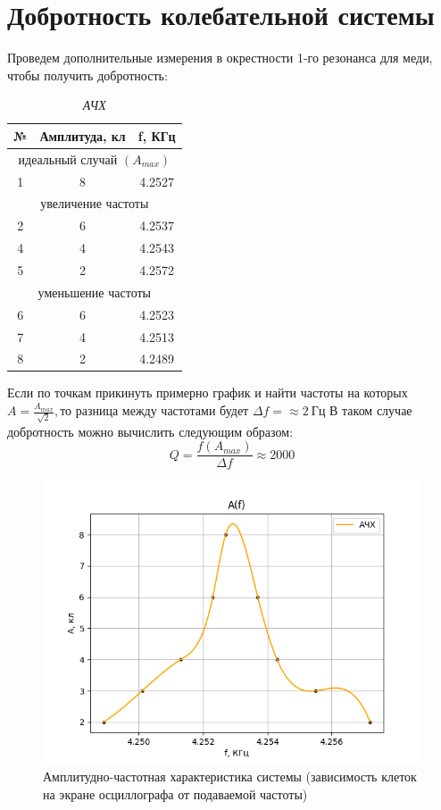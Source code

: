 \documentclass[a4paper, 10pt, twocolumn]{article}
\begin{document}
\section{Добротность колебательной системы}
 Проведем дополнительные измерения в окрестности 1-го резонанса
для меди, чтобы получить добротность:
\begin{table}[h]
    \centering
    \caption{\textit{АЧХ}}
    \label{tab:my_label}
    \begin{tabular}{|c|c|c|}
    \hline
    № & Амплитуда, кл & f, КГц \\ \hline
    \multicolumn{3}{c}{идеальный случай $(A_{max})$} \\ \hline
    1 & 8 & 4.2527 \\ \hline
    \multicolumn{3}{c}{увеличение частоты} \\ \hline
    2 & 6 & 4.2537 \\ \hline
    4 & 4 & 4.2543 \\ \hline
    5 & 2 & 4.2572 \\ \hline
    \multicolumn{3}{c}{уменьшение частоты} \\ \hline
    6 & 6 & 4.2523 \\ \hline
    7 & 4 & 4.2513 \\ \hline
    8 & 2 & 4.2489 \\ \hline
    \end{tabular}
\end{table}
Если по точкам прикинуть примерно график и найти частоты на которых $A = \frac{A_{max}}{\sqrt{2}}, \text{то разница между частотами будет } \Delta f = \approx 2~\text{Гц}$
В таком случае добротность можно вычислить следующим образом: $$ Q = \frac{f(A_{max})}{\Delta f} \approx 2000 $$
\begin{figure}[H]
    \includegraphics[width=1\linewidth]{graphs/figure4.png}
    \caption{Амплитудно-частотная характеристика системы (зависимость клеток на
    экране осциллографа от подаваемой частоты)}
\end{figure} 
\end{document}
